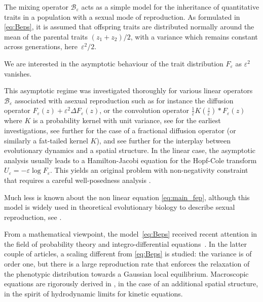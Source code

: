 \documentclass[JEP,XML,SOM,Unicode]{cedram}
\let\mathcal\mathscr
\newcommand{\cB}{\mathcal{B}}
\theoremstyle{plain}
\theoremstyle{definition}
\let\eps\varepsilon
\begin{document}
The mixing operator $\cB_\eps$ acts as a simple model for the inheritance of quantitative traits in a population with a sexual mode of reproduction. As formulated in \eqref{eq:Beps}, it is assumed that offspring traits are distributed normally around the mean of the parental traits $(z_1 + z_2)/2$, with a variance which remains constant across generations, here~$\eps^2/2$.

We are interested in the asymptotic behaviour of the trait distribution $F_\eps$ as $\eps^2$ vanishes.

This asymptotic regime was investigated thoroughly for various linear operators~$\cB_\eps$ associated with asexual reproduction such as for instance the diffusion operator $F_\eps(z) + \eps^2 \Delta F_\eps(z)$, or the convolution operator $\frac1\eps K(\frac z\eps)*F_\eps(z)$ where $K$ is a probability kernel with unit variance, see \cite{diekmann2005,perthame-book,barlesperthamecontemporary,
mirrahimiconcentration,
lorz2011dirac} for the earliest investigations, see further \cite{meleard_singular_2015,
mirrahimi_singular_2018,bouin_thin_2018} for the case of a fractional diffusion operator (or similarly a fat-tailed kernel $K$), and see further \cite{mirrahimi_adaptation_2013,
mirrahimi_asymptotic_2015,
bouin_hamiltonjacobi_2015,
lam_integro-pde_2017,
gandon_hamiltonjacobi_2017,
mirrahimi_hamiltonjacobi_2017, mirrahimi_evolution_2018,calvez_non-local_2018} for the interplay between evolutionary dynamics and a spatial structure. In the linear case, the asymptotic analysis usually leads to a Hamilton-Jacobi equation for the Hopf-Cole transform $U_\eps = -\eps \log F_\eps$. This yields an original problem with non-negativity constraint that requires a careful well-posedness analysis \cite{mirrahimi_class_2015,
calvez_uniqueness_2018}.

Much less is known about the non linear equation \eqref{eq:main_fep}, although this model is widely used in theoretical evolutionary biology to describe sexual reproduction, see \eg \cite{slatkin1970selection,
roughgarden1972evolution,
slatkin_niche_1976,
bulmerbook,menormal,
tufto_quantitative_2000,	
barfield_evolution_2011, huisman2012comparison,
cotto-ronce,
weberinfinitesimal,turelli_comm}.

From a mathematical viewpoint, the model~\eqref{eq:Beps} received recent attention in the field of probability theory \cite{weberinfinitesimal} and integro-differential equations~\cite{raoulmirrahimiinfinitesimal,Raoul}.
In the latter couple of articles, a scaling different from \eqref{eq:Beps} is studied: the variance is of order one, but there is a large reproduction rate that enforces the relaxation of the phenotypic distribution towards a Gaussian local equilibrium. Macroscopic equations are rigorously derived in \cite{Raoul}, in the case of an additional spatial structure, in the spirit of hydrodynamic limits for kinetic equations.
\end{document}
